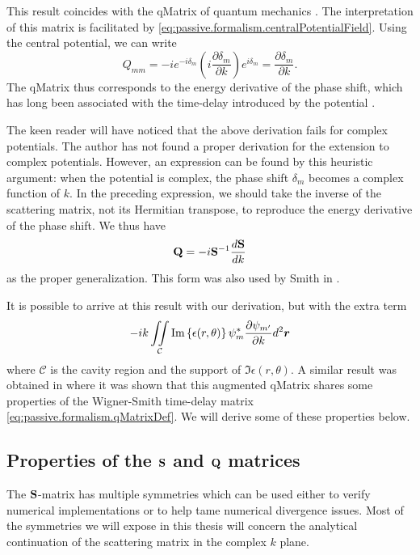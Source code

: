 This result coincides with the \gls{qMatrix} of quantum 
mechanics \cite{SMI1960}. The interpretation of this 
matrix is facilitated by \eqref{eq:passive.formalism.centralPotentialField}. 
Using the central potential, we can write
  \begin{equation}
    Q_{mm} = -ie^{-i\delta_m}\left(i\frac{\partial\delta_m}{\partial k}\right)e^{i\delta_m} = \frac{\partial\delta_m}{\partial k}.
  \end{equation}
The \gls{qMatrix} thus corresponds to the energy derivative of the 
phase shift, which has long been associated with the time-delay
introduced by the potential \cite{EIS1948,SMI1960,CAR2002}. 

The keen reader will have noticed that the above derivation
fails for complex potentials. The author has not found a proper
derivation for the extension to complex potentials. However, 
an expression can be found by this heuristic argument:
when the potential is complex, the phase shift $\delta_m$
becomes a complex function of $k$. In the preceding expression, 
we should take the inverse of the scattering matrix, not its Hermitian
transpose, to reproduce the energy derivative of the phase shift.
We thus have
  \begin{equation}
   \mathbf{Q} = -i\mathbf{S}^{-1}\frac{d\mathbf{S}}{dk}
  \end{equation}
as the proper generalization. This form was also used by Smith in
\cite{SMI1960}.

It is possible to arrive at this result with our derivation, but
with the extra term
	\begin{equation}
		-ik\mathop{\iint}_\mathcal{C}\text{Im}\left\{\epsilon(r,\theta)\right\}\psi_m^*\frac{\partial\psi_{m'}}{\partial k}d^2\boldsymbol{r}
	\end{equation}
where $\mathcal{C}$ is the cavity region and the support of 
$\Im{\epsilon(r,\theta)}$. A similar result was obtained in 
\cite{MAR1975} where it was shown that this augmented \gls{qMatrix}
shares some properties of the Wigner-Smith time-delay matrix 
\eqref{eq:passive.formalism.qMatrixDef}. We will derive some of
these properties below. 


\subsection{Properties of the $\mathbf{S}$ and $\mathbf{Q}$ matrices}
The $\mathbf{S}$-matrix has multiple symmetries which can be used 
either to verify numerical implementations or to help tame 
numerical divergence issues. Most of the symmetries we will
expose in this thesis will concern the analytical continuation
of the scattering matrix in the complex $k$ plane. 

